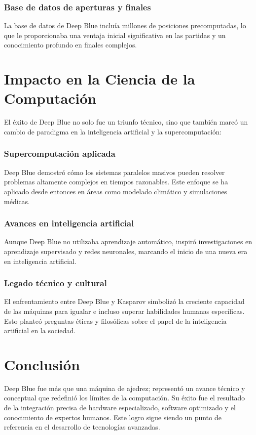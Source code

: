 \documentclass[12pt,a4paper]{article}
\begin{document}
\subsubsection*{Base de datos de aperturas y finales}
La base de datos de Deep Blue incluía millones de posiciones precomputadas, lo que le proporcionaba una ventaja inicial significativa en las partidas y un conocimiento profundo en finales complejos.

\section{Impacto en la Ciencia de la Computación}
El éxito de Deep Blue no solo fue un triunfo técnico, sino que también marcó un cambio de paradigma en la inteligencia artificial y la supercomputación:

\subsubsection*{Supercomputación aplicada}
Deep Blue demostró cómo los sistemas paralelos masivos pueden resolver problemas altamente complejos en tiempos razonables. Este enfoque se ha aplicado desde entonces en áreas como modelado climático y simulaciones médicas.

\subsubsection*{Avances en inteligencia artificial}
Aunque Deep Blue no utilizaba aprendizaje automático, inspiró investigaciones en aprendizaje supervisado y redes neuronales, marcando el inicio de una nueva era en inteligencia artificial.

\subsubsection*{Legado técnico y cultural}
El enfrentamiento entre Deep Blue y Kasparov simbolizó la creciente capacidad de las máquinas para igualar e incluso superar habilidades humanas específicas. Esto planteó preguntas éticas y filosóficas sobre el papel de la inteligencia artificial en la sociedad.

\section{Conclusión}
Deep Blue fue más que una máquina de ajedrez; representó un avance técnico y conceptual que redefinió los límites de la computación. Su éxito fue el resultado de la integración precisa de hardware especializado, software optimizado y el conocimiento de expertos humanos. Este logro sigue siendo un punto de referencia en el desarrollo de tecnologías avanzadas.
\end{document}

